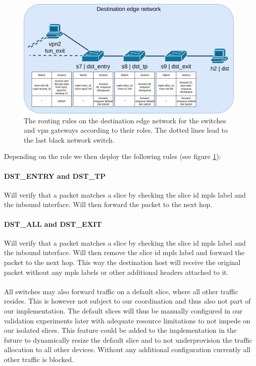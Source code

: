 \begin{figure}[ht]
  \centering
  \includegraphics[width=\linewidth]{images/chapter_6/routing_destination.png}
  \caption[Routing on the destination edge network]{The routing rules on the destination edge network for the switches and \acrshort{vpn} gateways according to their roles. The dotted lines lead to the last black network switch.}
  \label{fig:routing_destination}
\end{figure}

Depending on the role we then deploy the following rules (see figure \ref{fig:routing_destination}):

\paragraph{DST\_ENTRY and DST\_TP} Will verify that a packet matches a slice by checking the slice id \acrshort{mpls} label and the inbound interface. Will then forward the packet to the next hop.

\paragraph{DST\_ALL and DST\_EXIT} Will verify that a packet matches a slice by checking the slice id \acrshort{mpls} label and the inbound interface. Will then remove the slice id \acrshort{mpls} label and forward the packet to the next hop. This way the destination host will receive the original packet without any \acrshort{mpls} labels or other additional headers attached to it.

\paragraph{} All switches may also forward traffic on a default slice, where all other traffic resides. This is however not subject to our coordination and thus also not part of our implementation. The default slices will thus be manually configured in our validation experiments later with adequate resource limitations to not impede on our isolated slices. This feature could be added to the implementation in the future to dynamically resize the default slice and to not underprovision the traffic allocation to all other devices. Without any additional configuration currently all other traffic is blocked.

